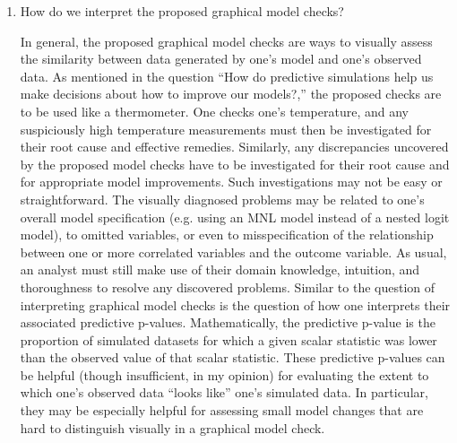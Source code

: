\documentclass[preprint]{elsarticle}
\newenvironment{QandA}{\begin{enumerate}[label=\bfseries\alph*.]\bfseries}
                      {\end{enumerate}}
\newenvironment{answered}{\par\normalfont}{}
\begin{document}
\begin{appendices}
\begin{QandA}
   \item How do we interpret the proposed graphical model checks?
       \begin{answered}
           In general, the proposed graphical model checks are ways to visually assess the similarity between data generated by one's model and one's observed data. As mentioned in the question ``How do predictive simulations help us make decisions about how to improve our models?,'' the proposed checks are to be used like a thermometer. One checks one's temperature, and any suspiciously high temperature measurements must then be investigated for their root cause and effective remedies. Similarly, any discrepancies uncovered by the proposed model checks have to be investigated for their root cause and for appropriate model improvements. Such investigations may not be easy or straightforward. The visually diagnosed problems may be related to one's overall model specification (e.g. using an MNL model instead of a nested logit model), to omitted variables, or even to misspecification of the relationship between one or more correlated variables and the outcome variable. As usual, an analyst must still make use of their domain knowledge, intuition, and thoroughness to resolve any discovered problems.
           Similar to the question of interpreting graphical model checks is the question of how one interprets their associated predictive p-values. Mathematically, the predictive p-value is the proportion of simulated datasets for which a given scalar statistic was lower than the observed value of that scalar statistic. These predictive p-values can be helpful (though insufficient, in my opinion) for evaluating the extent to which one's observed data ``looks like'' one's simulated data. In particular, they may be especially helpful for assessing small model changes that are hard to distinguish visually in a graphical model check.
       \end{answered}


\end{QandA}
\end{appendices}
\end{document}
